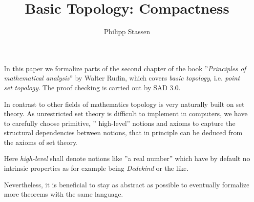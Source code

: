 \documentclass[10pt]{article}
\title{Basic Topology: Compactness}
\author{Philipp Stassen}
\theoremstyle{definition}
\theoremstyle{plain}
\theoremstyle{remark}
\begin{document}
\maketitle

In this paper we formalize parts of the second chapter of the book ''\emph{Principles of mathematical analysis}'' by Walter Rudin, which covers \emph{basic topology}, i.e. \emph{point set topology}. The proof checking is carried out by SAD 3.0.

In contrast to other fields of mathematics topology is very naturally built on set theory. As unrestricted set theory is difficult to implement in computers, we have to carefully choose primitive, '' high-level'' notions and axioms to capture the structural dependencies between notions, that in principle can be deduced from the axioms of set theory. 

Here \emph{high-level} shall denote notions like ''a real number'' which have by default no intrinsic properties as for example being \emph{Dedekind} or the like.

Nevertheless, it is beneficial to stay as abstract as possible to eventually formalize more theorems with the same language. \medskip
\end{document}
